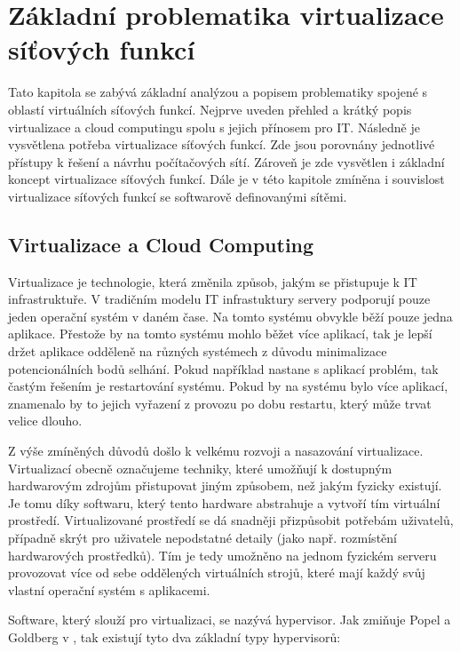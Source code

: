 \chapter{Základní problematika virtualizace síťových funkcí}

Tato kapitola se zabývá základní analýzou a popisem problematiky spojené s oblastí virtuálních síťových funkcí. Nejprve uveden přehled a krátký popis virtualizace a cloud computingu spolu s jejich přínosem pro IT. Následně je vysvětlena potřeba virtualizace síťových funkcí. Zde jsou porovnány jednotlivé přístupy k řešení a návrhu počítačových sítí. Zároveň je zde vysvětlen i základní koncept virtualizace síťových funkcí. Dále je v této kapitole zmíněna i souvislost virtualizace síťových funkcí se softwarově definovanými sítěmi.

\section{Virtualizace a Cloud Computing}

Virtualizace je technologie, která změnila způsob, jakým se přistupuje k IT infrastruktuře. V tradičním modelu IT infrastuktury servery podporují pouze jeden operační systém v daném čase. Na tomto systému obvykle běží pouze jedna aplikace. Přestože by na tomto systému mohlo běžet více aplikací, tak je lepší držet aplikace odděleně na různých systémech z důvodu minimalizace potencionálních bodů selhání. Pokud například nastane s aplikací problém, tak častým řešením je restartování systému. Pokud by na systému bylo více aplikací, znamenalo by to jejich vyřazení z provozu po dobu restartu, který může trvat velice dlouho. \cite{VM_book}

Z výše zmíněných důvodů došlo k velkému rozvoji a nasazování virtualizace. Virtualizací obecně označujeme techniky, které umožňují k dostupným hardwarovým zdrojům přistupovat jiným způsobem, než jakým fyzicky existují. Je tomu díky softwaru, který tento hardware abstrahuje a vytvoří tím virtuální prostředí. Virtualizované prostředí se dá snadněji přizpůsobit potřebám uživatelů, případně skrýt pro uživatele nepodstatné detaily (jako např. rozmístění hardwarových prostředků). Tím je tedy umožněno na jednom fyzickém serveru provozovat více od sebe oddělených virtuálních strojů, které mají každý svůj vlastní operační systém s aplikacemi.

Software, který slouží pro virtualizaci, se nazývá hypervisor. Jak zmiňuje Popel a Goldberg v \cite{VM_architektura}, tak existují tyto dva základní typy hypervisorů:

